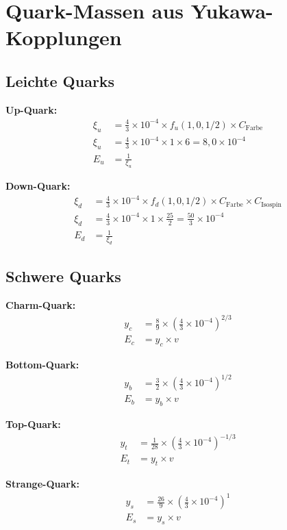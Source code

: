 \documentclass[12pt,a4paper]{article}
\begin{document}
	\section{Quark-Massen aus Yukawa-Kopplungen}
	
	\subsection{Leichte Quarks}
	
	\textbf{Up-Quark:}
	\begin{align}
		\xi_u &= \frac{4}{3} \times 10^{-4} \times f_u(1,0,1/2) \times C_{\text{Farbe}} \\
		\xi_u &= \frac{4}{3} \times 10^{-4} \times 1 \times 6 = 8,0 \times 10^{-4} \\
		E_u &= \frac{1}{\xi_u}
	\end{align}
	
	\textbf{Down-Quark:}
	\begin{align}
		\xi_d &= \frac{4}{3} \times 10^{-4} \times f_d(1,0,1/2) \times C_{\text{Farbe}} \times C_{\text{Isospin}} \\
		\xi_d &= \frac{4}{3} \times 10^{-4} \times 1 \times \frac{25}{2} = \frac{50}{3} \times 10^{-4} \\
		E_d &= \frac{1}{\xi_d}
	\end{align}
	
	\subsection{Schwere Quarks}
	
	\textbf{Charm-Quark:}
	\begin{align}
		y_c &= \frac{8}{9} \times \left(\frac{4}{3} \times 10^{-4}\right)^{2/3} \\
		E_c &= y_c \times v
	\end{align}
	
	\textbf{Bottom-Quark:}
	\begin{align}
		y_b &= \frac{3}{2} \times \left(\frac{4}{3} \times 10^{-4}\right)^{1/2} \\
		E_b &= y_b \times v
	\end{align}
	
	\textbf{Top-Quark:}
	\begin{align}
		y_t &= \frac{1}{28} \times \left(\frac{4}{3} \times 10^{-4}\right)^{-1/3} \\
		E_t &= y_t \times v
	\end{align}
	
	\textbf{Strange-Quark:}
	\begin{align}
		y_s &= \frac{26}{9} \times \left(\frac{4}{3} \times 10^{-4}\right)^{1} \\
		E_s &= y_s \times v
	\end{align}
	
\end{document}
